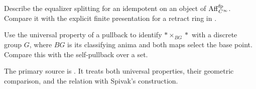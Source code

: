 \begin{exercise}
Describe the equalizer splitting for an idempotent on an object of
$\operatorname{Aff}_{C^\infty}^{\mathrm{fp}}$. Compare it with the
explicit finite presentation for a retract ring
in .
\end{exercise}

\begin{exercise}
Use the universal property of a pullback to identify
$*\times_{BG}*$ with a discrete group $G$, where $BG$ is its
classifying anima and both maps select the base point.
Compare this with the self-pullback over a set.
\end{exercise}

The primary source is
\cite[Definition~2.1, Theorem~3.22, Remark~3.26,
and Section~5]{Carchedi_Steffens_Universal_Derived_Manifolds}.
It treats both universal properties, their geometric comparison, and
the relation with Spivak's construction.

\let\theHchapter\talkfourHchapter
